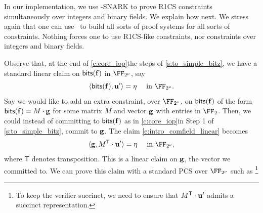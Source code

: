 In our implementation, we use \ftwoz-SNARK to prove R1CS constraints simultaneously over integers and binary fields. We explain how next. We stress again that one can use \ftwoz\ to build all sorts of proof systems for all sorts of constraints. Nothing forces one to use R1CS-like constraints, nor constraints over integers and binary fields. 

 Observe that, at the end of \iflncs\cref{c:core_iop}\else the steps of \cref{s:to_simple_bitz}\fi, we have a standard linear claim on $\mathsf{bits}(\mathbf{f})$ in $\comfield$, say \begin{equation}\label{e:intro_comfield_linear}\langle \bitstext(\bff), \uu'\rangle = \eta \quad \text{ in } \comfield.\end{equation}
  Say we would like to add an extra constraint, over $\comfield$, on $\mathsf{bits}(\mathbf{f})$ of the form $\mathsf{bits}(\mathbf{f}) = M \cdot \mathbf{g}$ for some matrix $M$ and vector $\mathbf{g}$ with entries in $\FF_2$. Then, we could instead of committing to $\mathsf{bits}(\mathbf{f})$ \iflncs as in \cref{c:core_iop}\else in Step 1 of \cref{s:to_simple_bitz}\fi, commit to $\mathbf{g}$. The claim  \eqref{e:intro_comfield_linear} becomes
 $$
\langle \bfg, M^{\mathsf{T}}\cdot \uu'\rangle = \eta \quad \text{ in } \comfield,
 $$
 where $\mathsf{T}$ denotes transposition. This is a linear claim on $\mathbf{g}$, the vector we committed to. We can prove this claim with a standard PCS over $\comfield$ such as \cite{whir}\footnote{To keep the verifier succinct, we need to ensure that $M^{\mathsf{T}}\cdot \mathbf{u}'$ admits a succinct representation.} 
 



 
 
